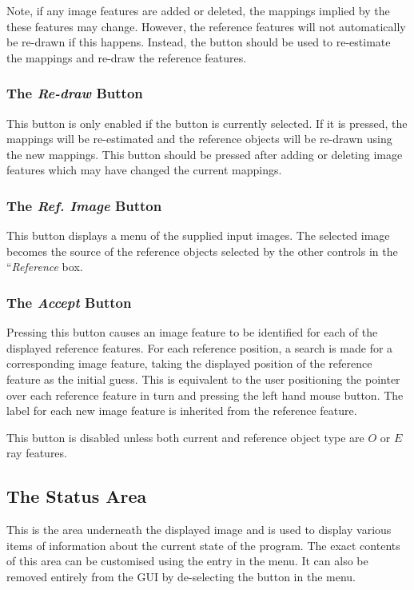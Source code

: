 Note, if any image features are added or deleted, the mappings implied by
the these features may change. However, the reference features will not
automatically be re-drawn if this happens. Instead, the  button should be used to re-estimate the
mappings and re-draw the reference features.

\subsubsection {The {\em Re-draw} Button}
This button is only enabled if the  button is currently selected. If it is
pressed, the mappings will be re-estimated and the reference objects will
be re-drawn using the new mappings. This button should be pressed after
adding or deleting image features which may have changed the current
mappings.

\subsubsection {The {\em Ref. Image} Button}
This button displays a menu of the supplied input images. The selected
image becomes the source of the reference objects selected by the other
controls in the ``{\em Reference} box.

\subsubsection {The {\em Accept} Button}
Pressing this button causes an image feature to be identified for each
of the displayed reference features. For each reference position, a search 
is made for a corresponding image feature, taking the displayed position of the
reference feature as the initial guess. This is equivalent to the user
positioning the pointer over each reference feature in turn and pressing
the left hand mouse button. The label for each new image feature is
inherited from the reference feature.

This button is disabled unless both current and reference object type
are $O$ or $E$ ray features.

\subsection {The Status Area}
This is the area underneath the displayed image and is used to display
various items of information about the current state of the program. The
exact contents of this area can be customised using the  entry in the  menu. It can also be removed entirely from
the GUI by de-selecting the  button in the  menu.

